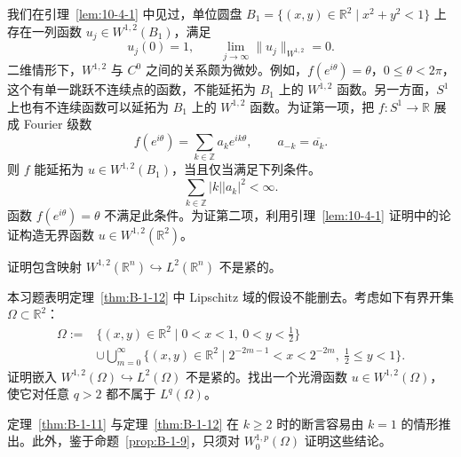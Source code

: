 \begin{remark}\label{rem:B-1-13}
我们在引理~\ref{lem:10-4-1} 中见过，单位圆盘 $B_1=\{(x,y)\in\mathbb R^2\mid x^2+y^2<1\}$ 上存在一列函数 $u_j\in W^{1,2}(B_1)$，满足
\[
u_j(0)=1,\qquad\lim_{j\to\infty}\|u_j\|_{W^{1,2}}=0.
\]
二维情形下，$W^{1,2}$ 与 $C^0$ 之间的关系颇为微妙。例如，$f(e^{i\theta})=\theta$，$0\le\theta<2\pi$，这个有单一跳跃不连续点的函数，不能延拓为 $B_1$ 上的 $W^{1,2}$ 函数。另一方面，$S^1$ 上也有不连续函数可以延拓为 $B_1$ 上的 $W^{1,2}$ 函数。为证第一项，把 $f:S^1\to\mathbb R$ 展成 Fourier 级数
\[
f(e^{i\theta})=\sum_{k\in\mathbb Z}a_ke^{ik\theta},\qquad a_{-k}=\overline{a_k}.
\]
则 $f$ 能延拓为 $u\in W^{1,2}(B_1)$，当且仅当满足下列条件。
\[
\sum_{k\in\mathbb Z}|k||a_k|^2<\infty.
\]
函数 $f(e^{i\theta})=\theta$ 不满足此条件。为证第二项，利用引理~\ref{lem:10-4-1} 证明中的论证构造无界函数 $u\in W^{1,2}(\mathbb R^2)$。
\end{remark}

\begin{exercise}\label{ex:B-1-14}
证明包含映射 $W^{1,2}(\mathbb R^n)\hookrightarrow L^2(\mathbb R^n)$ 不是紧的。
\end{exercise}

\begin{exercise}\label{ex:B-1-15}
本习题表明定理~\ref{thm:B-1-12} 中 Lipschitz 域的假设不能删去。考虑如下有界开集 $\Omega\subset\mathbb R^2$：
\[
\begin{split}
\Omega:={}&\{(x,y)\in\mathbb R^2\mid 0<x<1,\ 0<y<\tfrac12\}\\
&\cup\bigcup_{m=0}^\infty\{(x,y)\in\mathbb R^2\mid 2^{-2m-1}<x<2^{-2m},\ \tfrac12\le y<1\}.
\end{split}
\]
证明嵌入 $W^{1,2}(\Omega)\hookrightarrow L^2(\Omega)$ 不是紧的。找出一个光滑函数 $u\in W^{1,2}(\Omega)$，使它对任意 $q>2$ 都不属于 $L^q(\Omega)$。
\end{exercise}

定理~\ref{thm:B-1-11} 与定理~\ref{thm:B-1-12} 在 $k\ge2$ 时的断言容易由 $k=1$ 的情形推出。此外，鉴于命题~\ref{prop:B-1-9}，只须对 $W_0^{1,p}(\Omega)$ 证明这些结论。

